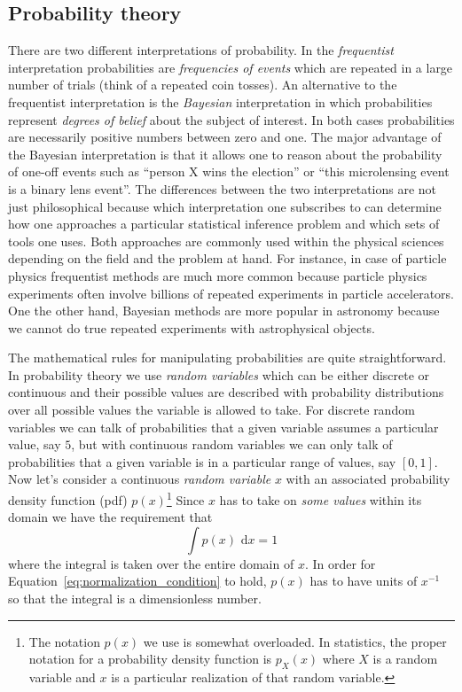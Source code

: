 \documentclass[12pt]{report}
\newcommand{\ud}{\,\mathrm{d}}
\begin{document}
\subsection{Probability theory}
There are two different interpretations of probability. In the
\emph{frequentist} interpretation probabilities are \emph{frequencies of
    events} which are repeated in a large number of trials (think of a repeated
coin tosses). An alternative to the frequentist interpretation is the
\emph{Bayesian} interpretation in which probabilities represent \emph{degrees
    of belief} about the subject of interest. In both cases probabilities are
necessarily positive numbers between zero and one. The major advantage of the
Bayesian interpretation is that it allows one to reason about the probability
of one-off events such as ``person X wins the election'' or ``this microlensing
event is a binary lens event''. The differences between the two interpretations
are not just philosophical because which interpretation one subscribes to can
determine how one approaches a particular statistical inference problem and
which sets of tools one uses. Both approaches are commonly used within the
physical sciences depending on the field and the problem at hand. For instance,
in case of particle physics frequentist methods are much more common because
particle physics experiments often involve billions of repeated experiments in
particle accelerators. One the other hand, Bayesian methods are more popular in
astronomy because we cannot do true repeated experiments with astrophysical
objects.

The mathematical rules for manipulating probabilities are quite
straightforward. In probability theory we use \emph{random variables} which can
be either discrete or continuous and their possible values are described with
probability distributions over all possible values the variable is allowed to
take. For discrete random variables we can talk of probabilities that a given
variable assumes a particular value, say $5$, but with continuous random
variables we can only talk of probabilities that a given variable is in a
particular range of values, say $[0,1]$. Now let's consider a continuous
\emph{random variable} $x$ with an associated probability density function
(pdf) $p(x)$\footnote{The notation $p(x)$ we use is somewhat overloaded. In
    statistics, the proper notation for a probability density function is
    $p_{X}(x)$ where $X$ is a random variable and $x$ is a particular realization
    of that random variable.} Since $x$ has to take on \emph{some values} within
its domain we have the requirement that
\begin{equation}
    \int p(x)\,\ud x=1
    \label{eq:normalization_condition}
\end{equation}
where the integral is taken over the entire domain of $x$.
In order for Equation~\ref{eq:normalization_condition} to hold,
$p(x)$ has to have units of $x^{-1}$ so that
the integral is a dimensionless number.
\end{document}

